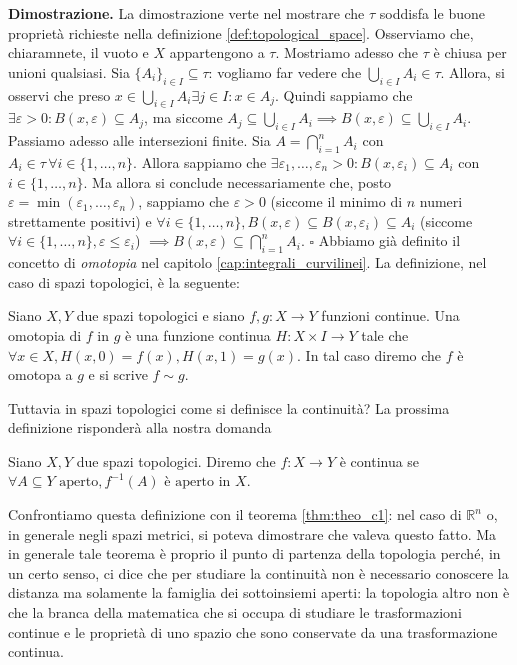 \noindent \textbf{Dimostrazione. }
    La dimostrazione verte nel mostrare che $\tau$ soddisfa le buone proprietà richieste nella definizione \ref{def:topological_space}. Osserviamo che, chiaramnete, il vuoto e $X$ appartengono a $\tau$. Mostriamo
    adesso che $\tau$ è chiusa per unioni qualsiasi. Sia $\{ A_i \}_{i \in I} \subseteq \tau$: vogliamo far vedere che $\bigcup\limits_{i \in I} A_i \in \tau$. Allora, si osservi che preso $x \in \bigcup\limits_{i \in I} A_i \exists j \in I : x \in A_j$. Quindi sappiamo
    che $\exists \varepsilon > 0 : B(x, \varepsilon) \subseteq A_j$, ma siccome $A_j \subseteq \bigcup\limits_{i \in I} A_i \implies B(x, \varepsilon) \subseteq \bigcup\limits_{i \in I} A_i$.
    Passiamo adesso alle intersezioni finite. Sia $A = \bigcap\limits_{i=1}^n A_i$ con $A_i \in \tau \, \forall i \in \{ 1, \ldots, n\}$. Allora sappiamo che $\exists \varepsilon_1, \ldots, \varepsilon_n > 0: B(x, \varepsilon_i) \subseteq A_i$ con $i \in \{1, \ldots, n \}$. Ma allora si conclude necessariamente
    che, posto $\varepsilon = \min(\varepsilon_1, \ldots, \varepsilon_n)$, sappiamo che $\varepsilon > 0$ (siccome il minimo di $n$ numeri strettamente positivi) e $\forall i \in \{1, \ldots, n \}, B(x, \varepsilon) \subseteq B(x, \varepsilon_i) \subseteq A_i$ (siccome $\forall i \in \{1, \ldots, n \}, \varepsilon \leq \varepsilon_i$) $\implies B(x, \varepsilon) \subseteq \bigcap\limits_{i=1}^n A_i$.
\hfill $\square$
%
Abbiamo già definito il concetto di \emph{omotopia} nel capitolo \ref{cap:integrali_curvilinei}. La definizione, nel caso di spazi topologici, è la seguente:
%
\vspace{0.5cm}
\begin{definition}[\textcolor{blue}{omotopia}]
    Siano $X, Y$ due spazi topologici e siano $f, g : X \to Y$ funzioni continue. Una omotopia di $f$ in $g$ è una funzione continua $H: X \times I \to Y$ tale che $\forall x \in X, H(x, 0) = f(x), H(x, 1) = g(x)$. In tal caso
    diremo che $f$ è omotopa a $g$ e si scrive $f \sim g$.
\end{definition}
%
Tuttavia in spazi topologici come si definisce la continuità? La prossima definizione risponderà alla nostra domanda
%
\vspace{0.5cm}
\begin{definition}[\textcolor{blue}{continuità in spazi topologici}]
    Siano $X, Y$ due spazi topologici. Diremo che $f: X \to Y$ è continua se $\forall A \subseteq Y \text{ aperto}, f^{-1}(A) \text{ è aperto in } X$.
\end{definition}
%
\begin{remark}
    Confrontiamo questa definizione con il teorema \ref{thm:theo_c1}: nel caso di $\mathbb{R}^n$ o, in generale negli spazi metrici, si poteva dimostrare che valeva questo fatto. Ma in generale tale teorema è proprio il punto di partenza
    della topologia perché, in un certo senso, ci dice che per studiare la continuità non è necessario conoscere la distanza ma solamente la famiglia dei sottoinsiemi aperti: la topologia altro non è che la branca della matematica che si occupa
    di studiare le trasformazioni continue e le proprietà di uno spazio che sono conservate da una trasformazione continua.
\end{remark}
